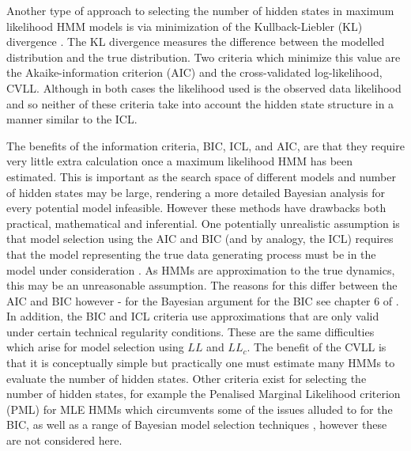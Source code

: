 Another type of approach to selecting the number of hidden states in maximum likelihood HMM models is via minimization of the Kullback-Liebler (KL) divergence \cite{kullbackInformationSufficiency1951}. The KL divergence  measures the difference between the modelled distribution and the true distribution. Two criteria which minimize this value are the Akaike-information criterion (AIC) \cite{akaikeInformationTheoryExtension1998} and the cross-validated log-likelihood, \cite{celeuxSelectingHiddenMarkov2008} CVLL. Although in both cases the likelihood used is the observed data likelihood and so neither of these criteria take into account the hidden state structure in a manner similar to the ICL. 

The benefits of the information criteria, BIC, ICL, and AIC, are that they require  very little extra calculation once a maximum likelihood HMM has been estimated. This is important as the search space of different models and number of hidden states may be large, rendering a more detailed Bayesian analysis for every potential model infeasible. However these methods have drawbacks both practical, mathematical and inferential. One potentially unrealistic assumption is that model selection using the AIC and BIC (and by analogy, the ICL) requires that the model representing the true data generating process must be in the model under consideration \cite{ripley_1996}. As HMMs are approximation to the true dynamics, this may be an unreasonable assumption. The reasons for this differ between the AIC and BIC however - for the Bayesian argument for the BIC see chapter 6 of \cite{bernardo2007bayesian}. In addition, the BIC and ICL criteria use approximations that are only valid under certain technical regularity conditions.\cite{mclachlanFiniteMixtureModels2000} These are the same difficulties which arise for  model selection using $LL$ and $LL_{c}$.  The benefit of the CVLL  is that it is conceptually simple but practically  one must estimate many HMMs to evaluate the number of hidden states. Other criteria exist for selecting the number of hidden states, for example the Penalised Marginal Likelihood criterion (PML) \cite{gassiatLikelihoodRatioInequalities2002} for MLE HMMs which circumvents some of the issues alluded to for the BIC, as well as a range of Bayesian model selection techniques \cite{gelmanBayesianDataAnalysis2014}\cite{bernardo2007bayesian}, however these are not considered here. 

